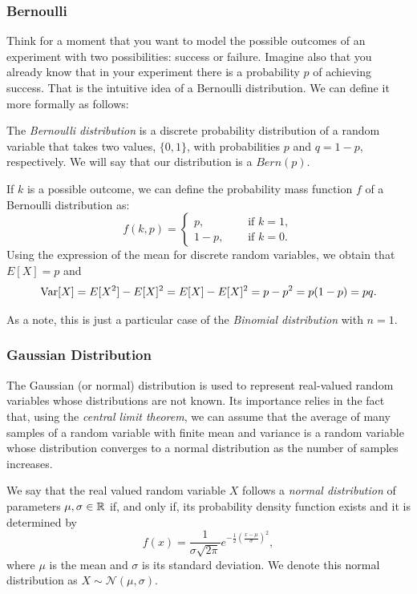 \subsubsection*{Bernoulli}

Think for a moment that you want to model the possible outcomes of an experiment with two possibilities: success or failure. Imagine also that you already know that in your experiment there is a probability $p$ of 
achieving success. That is the intuitive idea of a Bernoulli distribution. We can define it more formally as follows: 

The \emph{Bernoulli distribution} is a discrete probability distribution of a random variable that takes two values, $\{0,1\}$, with probabilities $p$ and $q = 1-p$, respectively. We will say that our distribution is a $Bern(p)$.

If $k$ is a possible outcome, we can define
the probability mass function $f$ of a Bernoulli distribution as:
$$
f(k,p) = 
\begin{cases} 
p, \quad & \text{ if } k=1,\\
1-p, \quad & \text{ if } k = 0.
\end{cases}
$$
Using the expression of the mean for discrete random variables, we obtain that $E[X] = p$ and 
$$
\operatorname*{Var}[X] = E[X^2] - E[X]^2 = E[X] - E[X]^2 = p-p^2 = p(1-p) = pq.
$$

As a note, this is just a particular case of the \emph{Binomial distribution} with $n=1$.

\subsubsection*{Gaussian Distribution}

The Gaussian (or normal) distribution is used to represent real-valued random variables whose distributions are not known.
Its importance relies in the fact that, using the \emph{central limit theorem}, we can assume that the average of many samples of
a random variable with finite mean and variance is a random variable whose distribution converges to a normal distribution as the number of samples increases.

\begin{ndef}
We say that the real valued random variable $X$ follows a \emph{normal distribution} of parameters $\mu,\sigma\in \mathbb{R}$ if, and only if,
its probability density function exists and it is determined by
\begin{equation}\label{gaussian:function}
f(x) = \frac{1}{\sigma \sqrt{2\pi}}e^{-\frac{1}{2}\left( \frac{x - \mu}{\sigma}\right)^2},
\end{equation}
where $\mu$ is the mean and $\sigma$ is its standard deviation. We denote this normal distribution as $X \sim \mathcal N (\mu,\sigma)$.
\end{ndef}

